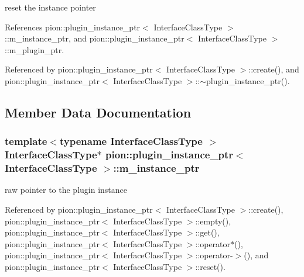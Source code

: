 reset the instance pointer 



References pion\-::plugin\-\_\-instance\-\_\-ptr$<$ Interface\-Class\-Type $>$\-::m\-\_\-instance\-\_\-ptr, and pion\-::plugin\-\_\-instance\-\_\-ptr$<$ Interface\-Class\-Type $>$\-::m\-\_\-plugin\-\_\-ptr.



Referenced by pion\-::plugin\-\_\-instance\-\_\-ptr$<$ Interface\-Class\-Type $>$\-::create(), and pion\-::plugin\-\_\-instance\-\_\-ptr$<$ Interface\-Class\-Type $>$\-::$\sim$plugin\-\_\-instance\-\_\-ptr().



\subsection{Member Data Documentation}
\hypertarget{classpion_1_1plugin__instance__ptr_a414a8f8e915a41caa94aca991cbb775e}{
\subsubsection[{m\-\_\-instance\-\_\-ptr}]{\setlength{\rightskip}{0pt plus 5cm}template$<$typename Interface\-Class\-Type $>$ Interface\-Class\-Type$\ast$ {\bf pion\-::plugin\-\_\-instance\-\_\-ptr}$<$ Interface\-Class\-Type $>$\-::m\-\_\-instance\-\_\-ptr\hspace{0.3cm}{\ttfamily [protected]}}}\label{classpion_1_1plugin__instance__ptr_a414a8f8e915a41caa94aca991cbb775e}


raw pointer to the plugin instance 



Referenced by pion\-::plugin\-\_\-instance\-\_\-ptr$<$ Interface\-Class\-Type $>$\-::create(), pion\-::plugin\-\_\-instance\-\_\-ptr$<$ Interface\-Class\-Type $>$\-::empty(), pion\-::plugin\-\_\-instance\-\_\-ptr$<$ Interface\-Class\-Type $>$\-::get(), pion\-::plugin\-\_\-instance\-\_\-ptr$<$ Interface\-Class\-Type $>$\-::operator$\ast$(), pion\-::plugin\-\_\-instance\-\_\-ptr$<$ Interface\-Class\-Type $>$\-::operator-\/$>$(), and pion\-::plugin\-\_\-instance\-\_\-ptr$<$ Interface\-Class\-Type $>$\-::reset().


